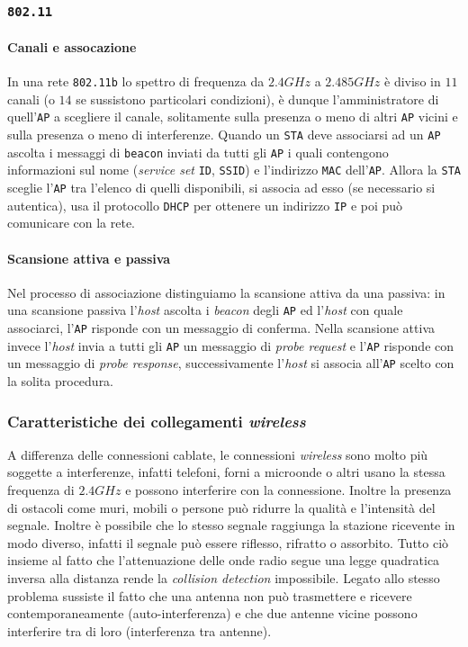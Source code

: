         \subsubsection{\texttt{802.11}}
            \paragraph{Canali e assocazione} In una rete \texttt{802.11b} lo spettro di frequenza da $2.4GHz$ a $2.485GHz$ è diviso in $11$ canali (o $14$ se sussistono particolari condizioni), è dunque l'amministratore di quell'\texttt{AP} a scegliere il canale, solitamente sulla presenza o meno di altri \texttt{AP} vicini e sulla presenza o meno di interferenze. Quando un \texttt{STA} deve associarsi ad un \texttt{AP} ascolta i messaggi di \texttt{beacon} inviati da tutti gli \texttt{AP} i quali contengono informazioni sul nome (\textit{service set }\texttt{ID}, \texttt{SSID}) e l'indirizzo \texttt{MAC} dell'\texttt{AP}. Allora la \texttt{STA} sceglie l'\texttt{AP} tra l'elenco di quelli disponibili, si associa ad esso (se necessario si autentica), usa il protocollo \texttt{DHCP} per ottenere un indirizzo \texttt{IP} e poi può comunicare con la rete.
            \paragraph{Scansione attiva e passiva} Nel processo di associazione distinguiamo la scansione attiva da una passiva: in una scansione passiva l'\textit{host} ascolta i \textit{beacon} degli \texttt{AP} ed l'\textit{host} con quale associarci, l'\texttt{AP} risponde con un messaggio di conferma. Nella scansione attiva invece l'\textit{host} invia a tutti gli \texttt{AP} un messaggio di \textit{probe request} e l'\texttt{AP} risponde con un messaggio di \textit{probe response}, successivamente l'\textit{host} si associa all'\texttt{AP} scelto con la solita procedura.
        \subsubsection{Caratteristiche dei collegamenti \textit{wireless}}
            A differenza delle connessioni cablate, le connessioni \textit{wireless} sono molto più soggette a interferenze, infatti telefoni, forni a microonde o altri usano la stessa frequenza di $2.4GHz$ e possono interferire con la connessione. Inoltre la presenza di ostacoli come muri, mobili o persone può ridurre la qualità e l'intensità del segnale. Inoltre è possibile che lo stesso segnale raggiunga la stazione ricevente in modo diverso, infatti il segnale può essere riflesso, rifratto o assorbito.\newline
            Tutto ciò insieme al fatto che l'attenuazione delle onde radio segue una legge quadratica inversa alla distanza rende la \textit{collision detection} impossibile. Legato allo stesso problema sussiste il fatto che una antenna non può trasmettere e ricevere contemporaneamente (auto-interferenza) e che due antenne vicine possono interferire tra di loro (interferenza tra antenne).
